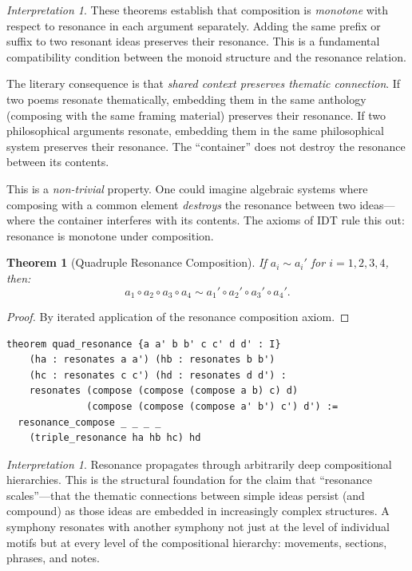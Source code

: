 \documentclass[11pt,openany]{book}
\theoremstyle{definition}
\theoremstyle{plain}
\newtheorem{theorem}[axiom]{Theorem}
\theoremstyle{remark}
\newtheorem{interpretation}[axiom]{Interpretation}
\newcommand{\compose}{\circ}                 %
\newcommand{\res}{\sim}                      %
\begin{document}
\begin{interpretation}
These theorems establish that composition is \emph{monotone} with respect to resonance in each argument separately. Adding the same prefix or suffix to two resonant ideas preserves their resonance. This is a fundamental compatibility condition between the monoid structure and the resonance relation.

The literary consequence is that \emph{shared context preserves thematic connection}. If two poems resonate thematically, embedding them in the same anthology (composing with the same framing material) preserves their resonance. If two philosophical arguments resonate, embedding them in the same philosophical system preserves their resonance. The ``container'' does not destroy the resonance between its contents.

This is a \emph{non-trivial} property. One could imagine algebraic systems where composing with a common element \emph{destroys} the resonance between two ideas---where the container interferes with its contents. The axioms of IDT rule this out: resonance is monotone under composition.
\end{interpretation}

\begin{theorem}[Quadruple Resonance Composition]
If $a_i \res a_i'$ for $i = 1, 2, 3, 4$, then:
\[
a_1 \compose a_2 \compose a_3 \compose a_4 \res a_1' \compose a_2' \compose a_3' \compose a_4'.
\]
\end{theorem}

\begin{proof}
By iterated application of the resonance composition axiom.
\end{proof}

\begin{lstlisting}[language=Lean4]
theorem quad_resonance {a a' b b' c c' d d' : I}
    (ha : resonates a a') (hb : resonates b b')
    (hc : resonates c c') (hd : resonates d d') :
    resonates (compose (compose (compose a b) c) d)
              (compose (compose (compose a' b') c') d') :=
  resonance_compose _ _ _ _
    (triple_resonance ha hb hc) hd
\end{lstlisting}

\begin{interpretation}
Resonance propagates through arbitrarily deep compositional hierarchies. This is the structural foundation for the claim that ``resonance scales''---that the thematic connections between simple ideas persist (and compound) as those ideas are embedded in increasingly complex structures. A symphony resonates with another symphony not just at the level of individual motifs but at every level of the compositional hierarchy: movements, sections, phrases, and notes.
\end{interpretation}
\end{document}
